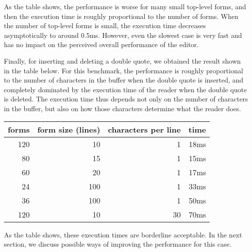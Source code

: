 As the table shows, the performance is worse for many small top-level
forms, and then the execution time is roughly proportional to the
number of forms.  When the number of top-level forms is small, the
execution time decreases asymptotically to around 0.5ms.  However,
even the slowest case is very fast and has no impact on the perceived
overall performance of the editor.

Finally, for inserting and deleting a double quote, we obtained the
result shown in the table below.  For this benchmark, the performance
is roughly proportional to the number of characters in the buffer when
the double quote is inserted, and completely dominated by the
execution time of the reader when the double quote is deleted.  The
execution time thus depends not only on the number of characters in
the buffer, but also on how those characters determine what the reader
does.

\vskip 0.3cm
\begin{tabular}{|r|r|r|r|}
\hline
forms & form size (lines) & characters per line & time\\
\hline
120 & 10 & 1 & 18ms\\
80 & 15  & 1 & 15ms\\
60 & 20  & 1 & 17ms\\
24 & 100 & 1 & 33ms\\
36 & 100 & 1 & 50ms\\
120 & 10 & 30 & 70ms\\
\hline
\end{tabular}
\vskip 0.3cm

\noindent
As the table shows, these execution times are borderline acceptable.
In the next section, we discuss possible ways of improving the
performance for this case.
